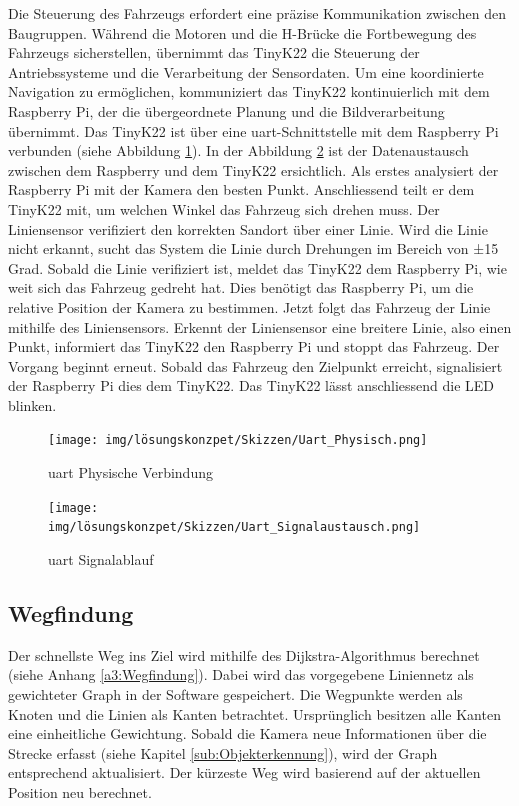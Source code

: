\documentclass[../main.tex]{subfiles}
\begin{document}
Die Steuerung des Fahrzeugs erfordert eine präzise Kommunikation zwischen den Baugruppen. Während die Motoren und die H-Brücke die Fortbewegung des Fahrzeugs sicherstellen, übernimmt das TinyK22 die Steuerung der Antriebssysteme und die Verarbeitung der Sensordaten. Um eine koordinierte Navigation zu ermöglichen, kommuniziert das TinyK22 kontinuierlich mit dem Raspberry Pi, der die übergeordnete Planung und die Bildverarbeitung übernimmt.
\newpage
Das TinyK22 ist über eine \Gls{uart}-Schnittstelle mit dem Raspberry Pi verbunden (siehe Abbildung \ref{img:UART_Physisch}). In der Abbildung \ref{img:UART_Signalablauf} ist der Datenaustausch zwischen dem Raspberry und dem TinyK22 ersichtlich. Als erstes  analysiert der Raspberry Pi mit der Kamera den besten Punkt. Anschliessend teilt er dem TinyK22 mit, um welchen Winkel das Fahrzeug sich drehen muss. Der Liniensensor verifiziert den korrekten Sandort über einer Linie. Wird die Linie nicht erkannt, sucht das System die Linie durch Drehungen im Bereich von ±15 Grad. Sobald die Linie verifiziert ist, meldet das TinyK22 dem Raspberry Pi, wie weit sich das Fahrzeug gedreht hat. Dies benötigt das Raspberry Pi, um die relative Position der Kamera zu bestimmen. Jetzt folgt das Fahrzeug der Linie mithilfe des Liniensensors. Erkennt der Liniensensor eine breitere Linie, also einen Punkt, informiert das TinyK22 den Raspberry Pi und stoppt das Fahrzeug. Der Vorgang beginnt erneut. Sobald das Fahrzeug den Zielpunkt erreicht, signalisiert der Raspberry Pi dies dem TinyK22. Das TinyK22 lässt anschliessend die LED blinken.

\begin{figure}[H]
\centering
\texttt{[image: img/lösungskonzpet/Skizzen/Uart\_Physisch.png]}
\caption{\Gls{uart} Physische Verbindung}
\label{img:UART_Physisch}
\end{figure}

\begin{figure}[H]
\centering
\texttt{[image: img/lösungskonzpet/Skizzen/Uart\_Signalaustausch.png]}
\caption{\Gls{uart} Signalablauf}
\label{img:UART_Signalablauf}
\end{figure}




\newpage

\subsection{Wegfindung}

Der schnellste Weg ins Ziel wird mithilfe des Dijkstra-Algorithmus berechnet (siehe Anhang \ref{a3:Wegfindung}). Dabei wird das vorgegebene Liniennetz als gewichteter Graph in der Software gespeichert. Die Wegpunkte werden als Knoten und die Linien als Kanten betrachtet. Ursprünglich besitzen alle Kanten eine einheitliche Gewichtung. Sobald die Kamera neue Informationen über die Strecke erfasst (siehe Kapitel \ref{sub:Objekterkennung}), wird der Graph entsprechend aktualisiert. Der kürzeste Weg wird basierend auf der aktuellen Position neu berechnet.
\end{document}
